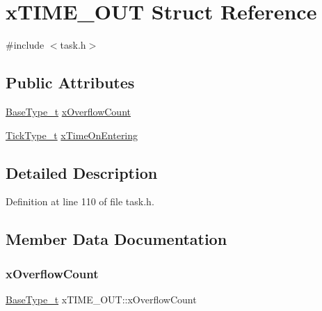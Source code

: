 \hypertarget{structx_t_i_m_e___o_u_t}{}\section{x\+T\+I\+M\+E\+\_\+\+O\+UT Struct Reference}
\label{structx_t_i_m_e___o_u_t}


{\ttfamily \#include $<$task.\+h$>$}

\subsection*{Public Attributes}
\begin{DoxyCompactItemize}
\item 
\hyperlink{externals_2freertos_2portable_2_g_c_c_2_a_r_m___c_m0_2portmacro_8h_a46fb21e00ae0729d7515c0fbf2269796}{Base\+Type\+\_\+t} \hyperlink{structx_t_i_m_e___o_u_t_a9289c6f97096a9b3e3fc705d0bc5a160}{x\+Overflow\+Count}
\item 
\hyperlink{externals_2freertos_2portable_2_g_c_c_2_a_r_m___c_m0_2portmacro_8h_aa69c48c6e902ce54f70886e6573c92a9}{Tick\+Type\+\_\+t} \hyperlink{structx_t_i_m_e___o_u_t_a3464939ca050f7bcc6ffe0d8d3766337}{x\+Time\+On\+Entering}
\end{DoxyCompactItemize}


\subsection{Detailed Description}


Definition at line 110 of file task.\+h.



\subsection{Member Data Documentation}
\mbox{\label{structx_t_i_m_e___o_u_t_a9289c6f97096a9b3e3fc705d0bc5a160}} 
\subsubsection{\texorpdfstring{x\+Overflow\+Count}{xOverflowCount}}
{\footnotesize\ttfamily \hyperlink{externals_2freertos_2portable_2_g_c_c_2_a_r_m___c_m0_2portmacro_8h_a46fb21e00ae0729d7515c0fbf2269796}{Base\+Type\+\_\+t} x\+T\+I\+M\+E\+\_\+\+O\+U\+T\+::x\+Overflow\+Count}




